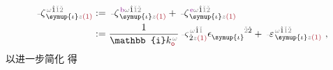 \begin{subequations}
	\abovedisplayskip=-8pt
\begin{align} %
	\xint{\begin{smallmatrix} ~ \\ {}^{}_{\mathcolor{gray}{-}} \\ ~ \end{smallmatrix}}{12}{\zeta}^{\;\! \mathcolor{gray}{\omega} \hat{1} \mathcolor{gray}{\check{1} \check{2}}}_{\;\! \symup{\iota} \mathcolor{gray}{z} \textcolor{Maroon}{(1)}} &:= \xint{\begin{smallmatrix} ~ \\ {}^{}_{\mathcolor{gray}{-}} \\ ~ \end{smallmatrix}}{12}{\zeta}^{\;\! \textcolor{Plum}{\text{b}} \mathcolor{gray}{\omega} \hat{1} \mathcolor{gray}{\check{1} \check{2}}}_{\;\! \symup{\iota} \mathcolor{gray}{z} \textcolor{Maroon}{(1)}} + \xint{\begin{smallmatrix} ~ \\ {}^{}_{\mathcolor{gray}{-}} \\ ~ \end{smallmatrix}}{12}{\zeta}^{\;\! \textcolor{Plum}{\text{e}} \mathcolor{gray}{\omega} \hat{1} \mathcolor{gray}{\check{1} \check{2}}}_{\;\! \symup{\iota} \mathcolor{gray}{z} \textcolor{Maroon}{(1)}} \label{eq:p<->n} \\ &:= \frac{1}{\mathbb{i} k_{\textcolor{Maroon}{\mathsf{o}}}^{\;\! \mathcolor{gray}{\omega}}} \xint{\begin{smallmatrix} ~ \\ {}^{}_{\mathcolor{gray}{-}} \\ ~ \end{smallmatrix}}{13}{\varsigma}^{\;\! \mathcolor{gray}{\omega} \hat{1} \mathcolor{gray}{\check{1}}}_{\;\! \dot{2} \mathcolor{gray}{z} \textcolor{Maroon}{(1)}} \epsilon^{\hphantom{\symup{\iota}}\mathcolor{gray}{\check{2}}\dot{2}}_{\symup{\iota}} + \xint{\begin{smallmatrix} ~ \\ {}^{}_{\mathcolor{gray}{-}} \\ ~ \end{smallmatrix}}{16}{\varepsilon}^{\;\! \mathcolor{gray}{\omega} \hat{1} \mathcolor{gray}{\check{1} \check{2}}}_{\;\! \symup{\iota} \mathcolor{gray}{z} \textcolor{Maroon}{(1)}}~,
\end{align}
\end{subequations}
以进一步简化  得
